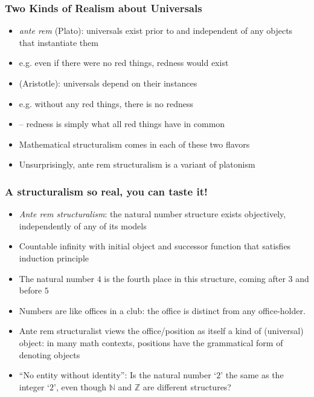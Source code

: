 \begin{frame}
\frametitle{Two Kinds of Realism about Universals}

\begin{itemize}[<+->]

\item \emph{ante rem} (Plato): universals exist prior to and independent of any objects that instantiate them
\item[] e.g. even if there were no red things, redness would exist

\item {} (Aristotle): universals depend on their instances
\item[] e.g. without any red things, there is no redness 
\item[] -- redness is simply what all red things have in common

\item Mathematical structuralism comes in each of these two flavors

\item Unsurprisingly, ante rem structuralism is a variant of platonism 

\end{itemize}
\end{frame}



\begin{frame}
\frametitle{A structuralism so real, you can taste it!}

\begin{itemize}[<+->]

\item \emph{Ante rem structuralism}: the natural number structure exists objectively, independently of any of its models 
\item[] Countable infinity with initial object and successor function that satisfies induction principle 

\item The natural number $4$ is the fourth place in this structure, coming after $3$ and before $5$

\item Numbers are like offices in a club: the office is distinct from any office-holder. 

\item Ante rem structuralist views the office/position as itself a kind of (universal) object: in many math contexts, positions have the grammatical form of denoting objects

\item ``No entity without identity'': Is the natural number `$2$' the same as the integer `$2$', even though $\mathbb{N}$ and $\mathbb{Z}$ are different structures? 



\end{itemize}
\end{frame}

